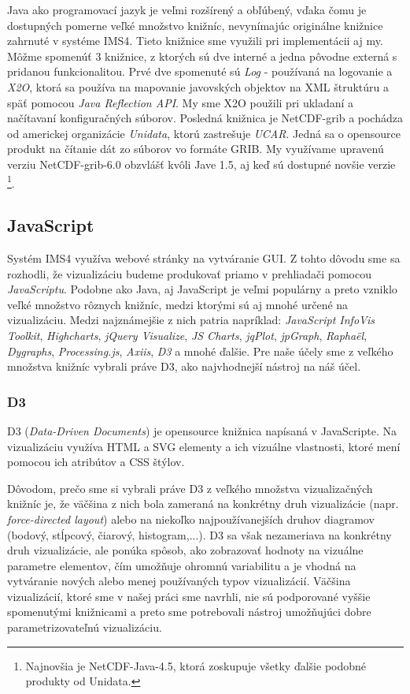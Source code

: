 Java ako programovací jazyk je veľmi rozšírený a obľúbený, vďaka čomu je dostupných pomerne veľké množstvo knižníc, nevynímajúc originálne knižnice zahrnuté v systéme IMS4. Tieto knižnice sme využili pri implementácii aj my. Môžme spomenúť 3 knižnice, z ktorých sú dve interné a jedna pôvodne externá s pridanou funkcionalitou. Prvé dve spomenuté sú \textit{Log} - používaná na logovanie a \textit{X2O}, ktorá sa používa na mapovanie javovských objektov na XML štruktúru a späť pomocou \textit{Java Reflection API}. My sme X2O použili pri ukladaní a načítavaní konfiguračných súborov. Posledná knižnica je NetCDF-grib \cite{XYZ} a pochádza od americkej organizácie \textit{Unidata}, ktorú zastrešuje \textit{UCAR}. Jedná sa o opensource produkt na čítanie dát zo súborov vo formáte GRIB. My využívame upravenú verziu NetCDF-grib-6.0 obzvlášť kvôli Jave 1.5, aj keď sú dostupné novšie verzie \footnote{Najnovšia je NetCDF-Java-4.5, ktorá zoskupuje všetky ďalšie podobné produkty od Unidata.}.

\subsection{JavaScript}
Systém IMS4 využíva webové stránky na vytváranie GUI. Z tohto dôvodu sme sa rozhodli, že vizualizáciu budeme produkovať priamo v prehliadači pomocou \textit{JavaScriptu}. Podobne ako Java, aj JavaScript je veľmi populárny a preto vzniklo veľké množstvo rôznych knižníc, medzi ktorými sú aj mnohé určené na vizualizáciu. Medzi najznámejšie z nich patria napríklad: \textit{JavaScript InfoVis Toolkit}, \textit{Highcharts}, \textit{jQuery Visualize}, \textit{JS Charts}, \textit{jqPlot}, \textit{jpGraph}, \textit{Raphaël}, \textit{Dygraphs},\textit{ Processing.js}, \textit{Axiis}, \textit{D3} a mnohé ďalšie. Pre naše účely sme z veľkého množstva knižníc vybrali práve D3, ako najvhodnejší nástroj na náš účel.

\subsubsection{D3}
D3 (\textit{Data-Driven Documents}) \cite{XYZ} je opensource knižnica napísaná v JavaScripte. Na vizualizáciu využíva HTML a SVG elementy a ich vizuálne vlastnosti, ktoré mení pomocou ich atribútov a CSS štýlov. 

Dôvodom, prečo sme si vybrali práve D3 z veľkého množstva vizualizačných knižníc je, že väčšina z nich bola zameraná na konkrétny druh vizualizácie (napr. \textit{force-directed layout}) alebo na niekoľko najpoužívanejších druhov diagramov (bodový, stĺpcový, čiarový, histogram,...). D3 sa však nezameriava na konkrétny druh vizualizácie, ale ponúka spôsob, ako zobrazovať hodnoty na vizuálne parametre elementov, čím umožňuje ohromnú variabilitu a je vhodná na vytváranie nových alebo menej používaných typov vizualizácií. Väčšina vizualizácií, ktoré sme v našej práci sme navrhli, nie sú podporované vyššie spomenutými knižnicami a preto sme potrebovali nástroj umožňujúci dobre parametrizovateľnú vizualizáciu.

